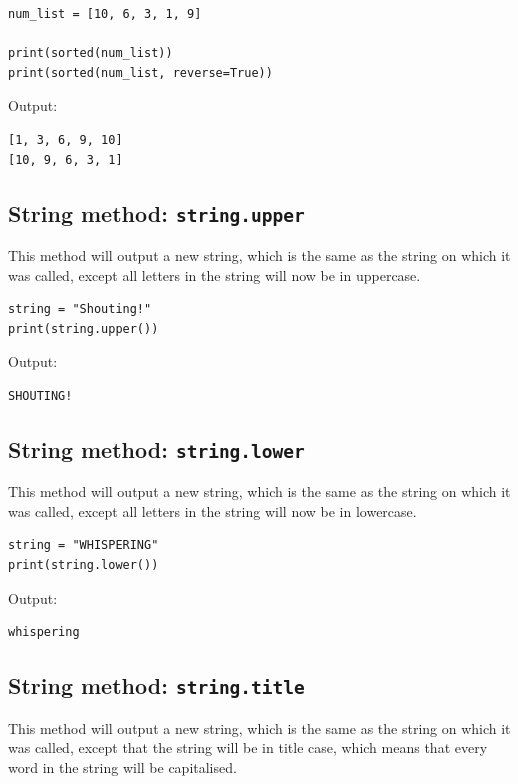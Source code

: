 \documentclass[11pt]{article}
\begin{document}
\begin{verbatim}
num_list = [10, 6, 3, 1, 9]

print(sorted(num_list))
print(sorted(num_list, reverse=True))
\end{verbatim}

 \noindent Output:

\begin{verbatim}
[1, 3, 6, 9, 10]
[10, 9, 6, 3, 1]
\end{verbatim}


 \newpage

\subsection{String method: \texttt{string.upper}}
\label{sec:org54a6f78}
This method will output a new string, which is the same as the string on which it was called, except all letters in the string will now be in uppercase.

\begin{verbatim}
string = "Shouting!"
print(string.upper())
\end{verbatim}

 \noindent Output:

\begin{verbatim}
SHOUTING!
\end{verbatim}

\subsection{String method: \texttt{string.lower}}
\label{sec:org5ac316c}
This method will output a new string, which is the same as the string on which it was called, except all letters in the string will now be in lowercase.

\begin{verbatim}
string = "WHISPERING"
print(string.lower())
\end{verbatim}

 \noindent Output:

\begin{verbatim}
whispering
\end{verbatim}

\subsection{String method: \texttt{string.title}}
\label{sec:orgac24eb4}
This method will output a new string, which is the same as the string on which it was called, except that the string will be in title case, which means that every word in the string will be capitalised.
\end{document}

